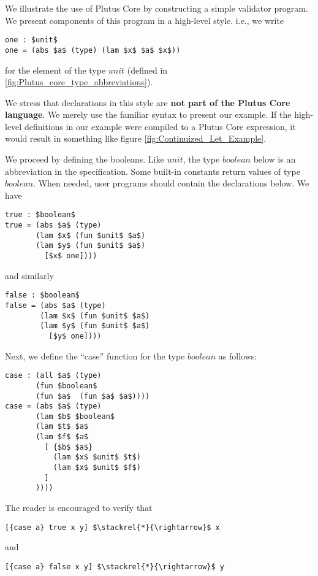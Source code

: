 \documentclass[../main.tex]{subfiles}
\begin{document}
We illustrate the use of Plutus Core by constructing a simple validator program. We present components of this program in a high-level style. i.e., we write
\begin{lstlisting}[basicstyle=\ttfamily,mathescape]
one : $unit$
one = (abs $a$ (type) (lam $x$ $a$ $x$))
\end{lstlisting}
for the element of the type $unit$ (defined in \ref{fig:Plutus_core_type_abbreviations}).%

We stress that declarations in this style are \textbf{not part of the Plutus Core language}. We merely use the familiar syntax to present our example. If the high-level definitions in our example were compiled to a Plutus Core expression, it would result in something like figure \ref{fig:Continuized_Let_Example}.

We proceed by defining the booleans. Like $unit$, the type $boolean$ below is an abbreviation in the specification. Some built-in constants return values of type $boolean$. When needed, user programs should contain the declarations below. We have
\begin{lstlisting}[basicstyle=\ttfamily,mathescape]
true : $boolean$
true = (abs $a$ (type)
       (lam $x$ (fun $unit$ $a$)
       (lam $y$ (fun $unit$ $a$)
         [$x$ one])))
\end{lstlisting}
and similarly
\begin{lstlisting}[basicstyle=\ttfamily,mathescape]
false : $boolean$
false = (abs $a$ (type) 
        (lam $x$ (fun $unit$ $a$)
        (lam $y$ (fun $unit$ $a$)
          [$y$ one])))
\end{lstlisting}

Next, we define the ``case'' function for the type $boolean$ as follows:
\begin{lstlisting}[basicstyle=\ttfamily,mathescape]
case : (all $a$ (type)
       (fun $boolean$
       (fun $a$  (fun $a$ $a$))))
case = (abs $a$ (type)
       (lam $b$ $boolean$
       (lam $t$ $a$
       (lam $f$ $a$ 
         [ {$b$ $a$} 
           (lam $x$ $unit$ $t$)
           (lam $x$ $unit$ $f$)
         ]
       ))))
\end{lstlisting}
The reader is encouraged to verify that
\begin{lstlisting}[basicstyle=\ttfamily,mathescape]
[{case a} true x y] $\stackrel{*}{\rightarrow}$ x
\end{lstlisting}  
and
\begin{lstlisting}[basicstyle=\ttfamily,mathescape]
[{case a} false x y] $\stackrel{*}{\rightarrow}$ y
\end{lstlisting}  
\end{document}
